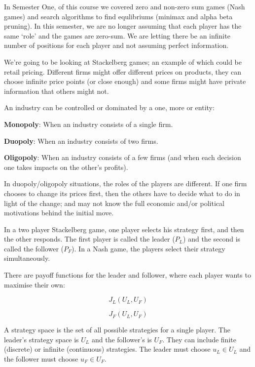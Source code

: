 
In Semester One, of this course we covered zero and non-zero sum games (Nash
games) and search algorithms to find equlibriums (minimax and alpha beta
pruning). In this semester, we are no longer assuming that each player has the
same `role' and the games are zero-sum. We are letting there be an infinite
number of positions for each player and not assuming perfect information.

We're going to be looking at Stackelberg games; an example of which could be
retail pricing. Different firms might offer different prices on products, they
can choose infinite price points (or close enough) and some firms might have
private information that others might not.

An industry can be controlled or dominated by a one, more or entity:

\begin{description}
  \item \textbf{Monopoly}: When an industry consists of a single firm.
  \item \textbf{Duopoly}: When an industry consists of two firms.
  \item \textbf{Oligopoly}: When an industry consists of a few firms (and when
  each decision one takes impacts on the other's profits).
\end{description}

In duopoly/oligopoly situations, the roles of the players are different. If one
firm chooses to change its prices first, then the others have to decide what to
do in light of the change; and may not know the full economic and/or political
motivations behind the initial move.

In a two player Stackelberg game, one player selects his strategy first, and
then the other responds. The first player is called the leader ($P_L$) and the
second is called the follower ($P_F$). In a Nash game, the players select their
strategy simultaneously.

There are payoff functions for the leader and follower, where each player wants
to maximise their own:

\[
  J_L(U_L, U_F)
\]

\[
  J_F(U_L, U_F)
\]

A strategy space is the set of all possible strategies for a single player. The
leader's strategy space is $U_L$ and the follower's is $U_F$. They can include
finite (discrete) or infinite (continuous) strategies. The leader must choose
$u_L \in U_L$ and the follower must choose $u_F \in U_F$.


